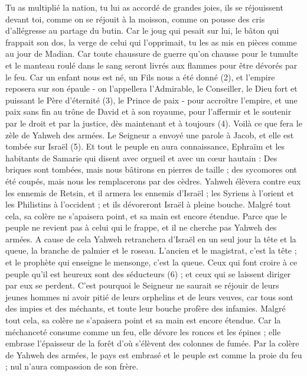 \begin{multicols}{2}
Tu as multiplié la nation, tu lui as accordé de grandes joies, ils se réjouissent devant toi, comme on se réjouit à la moisson, comme on pousse des cris d’allégresse au partage du butin.
Car le joug qui pesait sur lui, le bâton qui frappait son dos, la verge de celui qui l’opprimait, tu les as mis en pièces comme au jour de Madian.
Car toute chaussure de guerre qu’on chausse pour le tumulte et le manteau roulé dans le sang seront livrés aux flammes pour être dévorés par le feu.
Car un enfant nous est né, un Fils nous a été donné (2), et l'empire reposera sur son épaule - on l’appellera l'Admirable, le Conseiller, le Dieu fort et puissant le Père d'éternité (3), le Prince de paix -
pour accroître l’empire, et une paix sans fin au trône de David et à son royaume, pour l'affermir et le soutenir par le droit et par la justice, dès maintenant et à toujours (4). Voilà ce que fera le zèle de Yahweh des armées.
Le Seigneur a envoyé une parole à Jacob, et elle est tombée sur Israël (5).
Et tout le peuple en aura connaissance, Ephraïm et les habitants de Samarie qui disent avec orgueil et avec un cœur hautain :
Des briques sont tombées, mais nous bâtirons en pierres de taille ; des sycomores ont été coupés, mais nous les remplacerons par des cèdres.
Yahweh élèvera contre eux les ennemis de Retsin, et il armera les ennemis d'Israël ;
les Syriens à l’orient et les Philistins à l’occident ; et ils dévoreront Israël à pleine bouche. Malgré tout cela, sa colère ne s’apaisera point, et sa main est encore étendue.
Parce que le peuple ne revient pas à celui qui le frappe, et il ne cherche pas Yahweh des armées.
A cause de cela Yahweh retranchera d'Israël en un seul jour la tête et la queue, la branche de palmier et le roseau.
L'ancien et le magistrat, c'est la tête ; et le prophète qui enseigne le mensonge, c'est la queue.
Ceux qui font croire à ce peuple qu'il est heureux sont des séducteurs (6) ; et ceux qui se laissent diriger par eux se perdent.
C'est pourquoi le Seigneur ne saurait se réjouir de leurs jeunes hommes ni avoir pitié de leurs orphelins et de leurs veuves, car tous sont des impies et des méchants, et toute leur bouche profère des infamies. Malgré tout cela, sa colère ne s’apaisera point et sa main est encore étendue.
Car la méchanceté consume comme un feu, elle dévore les ronces et les épines ; elle embrase l’épaisseur de la forêt d’où s’élèvent des colonnes de fumée.
Par la colère de Yahweh des armées, le pays est embrasé et le peuple est comme la proie du feu ; nul n’aura compassion de son frère.

\end{multicols}
